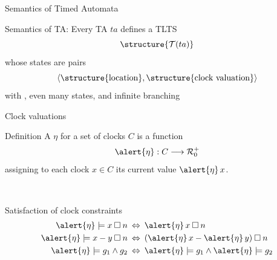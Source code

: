 \documentclass[aspectratio=169]{beamer}
\begin{document}
\begin{slide}{Semantics of Timed Automata}
\small

\begin{block}{Semantics of TA:}
Every TA $ta$ defines a TLTS 
\begin{equation*}
\structure{\TL{ta}}
\end{equation*}
whose states are pairs 
\begin{equation*}
\pair{\structure{\text{location}}, \structure{\text{clock valuation}} }
\end{equation*}
with , even  many states, and infinite branching
\end{block}
\end{slide}

\begin{slide}{Clock valuations}
\small


\begin{block}{Definition}
A  \alert{$\eta$} for a set of clocks $C$ is a function 
\begin{equation*}
\fdec{\alert{\eta}}{C}{\R_0^+}
\end{equation*}
assigning to each clock $x \in C$ its current value $\alert{\eta}\, x$.
\end{block}
~\\

\begin{block}{Satisfaction of clock constraints}
\begin{align*}
\alert{\eta} \models x \mathbin{\square} n \; & \dimp\; \alert{\eta}\, x \mathbin{\square} n\\
\alert{\eta} \models x-y \mathbin{\square} n \; & \dimp\; (\alert{\eta}\, x - \alert{\eta}\, y) \mathbin{\square} n\\
\alert{\eta} \models g_1 \land g_2 \; & \dimp\; \alert{\eta} \models g_1 \land \alert{\eta} \models g_2
\end{align*}
\end{block}
\end{slide}
\end{document}
